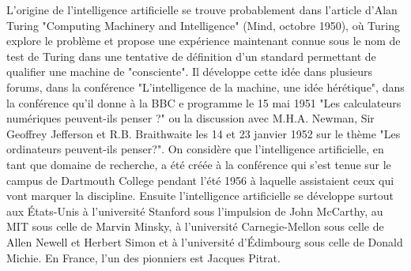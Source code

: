 \documentclass[a4paper,12pt]{article} %
\begin{document}
L'origine de l'intelligence artificielle se trouve probablement dans l'article d'Alan Turing "Computing Machinery and Intelligence" (Mind, octobre 1950), où Turing explore le problème et propose une expérience maintenant connue sous le nom de test de Turing dans une tentative de définition d'un standard permettant de qualifier une machine de "consciente".
\newline
Il développe cette idée dans plusieurs forums, dans la conférence "L'intelligence de la machine, une idée hérétique", dans la conférence qu'il donne à la BBC e programme le 15 mai 1951 "Les calculateurs numériques peuvent-ils penser ?" ou la discussion avec M.H.A. Newman, Sir Geoffrey Jefferson et R.B. Braithwaite les 14 et 23 janvier 1952 sur le thème "Les ordinateurs peuvent-ils penser?".
\newline
On considère que l'intelligence artificielle, en tant que domaine de recherche, a été créée à la conférence qui s'est tenue sur le campus de Dartmouth College pendant l'été 1956 à laquelle assistaient ceux qui vont marquer la discipline. 
\newline
Ensuite l'intelligence artificielle se développe surtout aux États-Unis à l'université Stanford sous l'impulsion de John McCarthy, au MIT sous celle de Marvin Minsky, à l'université Carnegie-Mellon sous celle de Allen Newell et Herbert Simon et à l'université d'Édimbourg sous celle de Donald Michie. En France, l'un des pionniers est Jacques Pitrat.
\newpage
\end{document}

